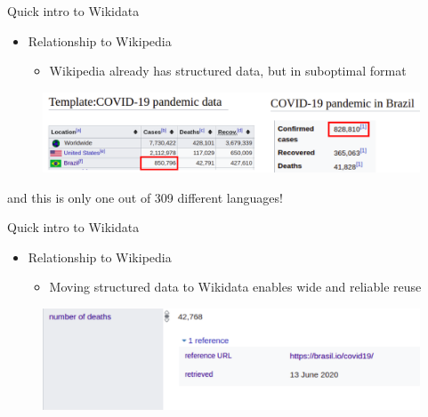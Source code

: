 \documentclass{beamer}
\begin{document}
\begin{frame}{Quick intro to Wikidata}

\begin{itemize}
    \item Relationship to Wikipedia
    
    \begin{itemize}
        \item Wikipedia already has structured data, but in suboptimal format
    \end{itemize}
    
\end{itemize}

\begin{figure}
\includegraphics[scale=0.45]{fig/template_covid_19_brasil.png}
\end{figure}
and this is only one out of 309 different languages!
\end{frame}


\begin{frame}{Quick intro to Wikidata}

\begin{itemize}
    \item Relationship to Wikipedia
    
    \begin{itemize}
        \item Moving structured data to Wikidata enables wide and reliable reuse
    \end{itemize}
    
\end{itemize}

\begin{figure}
\includegraphics[scale=0.45]{fig/covid_19_brasil_on_wikidata.png}
\end{figure}
\end{frame}
\end{document}
